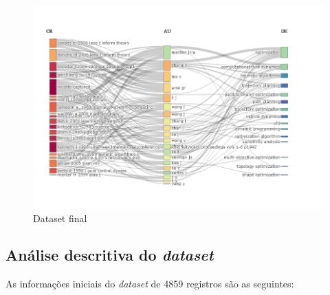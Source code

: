    \begin{figure}[H]
    \centering
    \includegraphics[width=1.3\textwidth]{experiments/KvotheKS/PesqBibliogr/AlgoritmosSimulacaoOptica-Dinamica/WoS-20220202/Dataset/AU_CR_DE.png}
    \caption{Dataset final}
    \label{fig:KvotheKS:Final_Data_Set}
\end{figure}

\subsection{Análise descritiva do \emph{dataset}}
    As informações iniciais do \emph{dataset} de 4859 registros são as seguintes:
    
